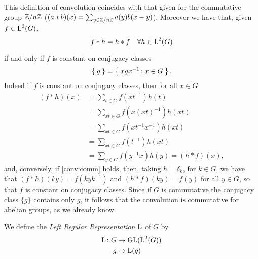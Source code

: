 \begin{rem}
This definition of convolution coincides with that given for the commutative group ${\mathbb Z}/{n{\mathbb Z}}$ ($(a\ast b)(x)=\sum_{y \in {\mathbb Z}/{n{\mathbb Z}}} a(y)b(x-y)$). 
Moreover we have that, given $f\in \operatorname{L}^2(G)$,
\begin{equation}
\label{conv:comm}
f*h=h*f \quad \forall h \in \operatorname{L}^2(G)
\end{equation}

if and only if $f$ is constant on conjugacy classes
\[
\Set{g}=\Set{xgx^{-1}\colon x\in G}.
\]
Indeed if $f$ is constant on conjugacy classes, then for all $x\in G$
\[
\begin{split}
(f\ast h)(x) &=\sum_{t \in G} f(xt^{-1})h(t)\\
&=\sum_{xt \in G} f(x(xt)^{-1})h(xt)\\
&=\sum_{xt \in G} f(xt^{-1}x^{-1})h(xt)\\
&=\sum_{xt \in G} f(t^{-1})h(xt)\\
&=\sum_{y \in G} f(y^{-1}x)h(y)= (h*f)(x),
\end{split}
\]
and, conversely, if \ref{conv:comm} holds, then, taking $h=\delta_k$, for $k\in G$, we have that $(f\ast h)(ky)=f(kyk^{-1})$ and $(h*f)(ky)=f(y)$ for all $y \in G$, so that $f$ is constant on conjugacy classes.
Since if $G$ is commutative the conjugacy class $\{g\}$ contains only $g$, it follows that the convolution is commutative for abelian groups, as we already know.
\end{rem}
\begin{ex}
We define the \emph{Left Regular Representation} $\operatorname{L}$ of $G$ by 
\begin{align*}
\operatorname{L}\colon G &\rightarrow \operatorname{GL}(\operatorname{L}^2(G))\\
		 g&\mapsto \operatorname{L}(g) 
\end{align*}
\end{ex}
